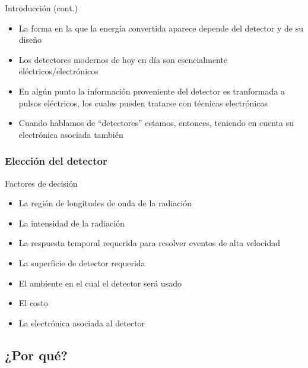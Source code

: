 \documentclass{beamer}
\begin{document}
\begin{frame}
\begin{block}{Introducción (cont.)}
\begin{itemize}
\item La forma en la que la energía convertida aparece {\color{blue}depende del detector y de
su diseño}
\item Los detectores modernos de hoy en día son esencialmente
eléctricos/electrónicos
\item En algún punto la información proveniente del detector es
tranformada a pulsos eléctricos, los cuales pueden tratarse con técnicas
electrónicas
\item Cuando hablamos de ``detectores'' estamos, entonces, teniendo en cuenta su
electrónica asociada también
\end{itemize}
\end{block}
\end{frame} 

\begin{frame}
\frametitle{Elección del detector}
\begin{alertblock}{Factores de decisión}
\begin{itemize}
\item La región de longitudes de onda de la radiación 
\item La intensidad de la radiación
\item La respuesta temporal requerida para resolver eventos de alta
velocidad
\item La superficie de detector requerida
\item El ambiente en el cual el detector será usado
\item El costo
\item La electrónica asociada al detector
\end{itemize}
\end{alertblock}
\end{frame} 

\subsection{¿Por qué?}
\end{document}
